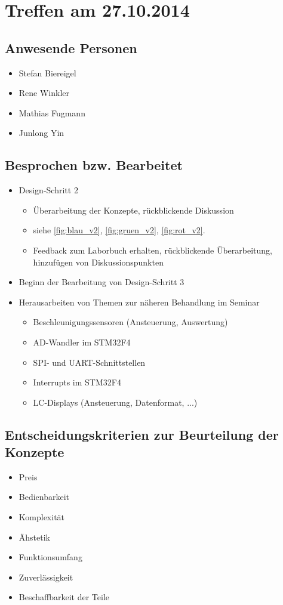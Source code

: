 \chapter{Treffen am 27.10.2014}
\section{Anwesende Personen}
\begin{itemize}
	\item Stefan Biereigel
	\item Rene Winkler
	\item Mathias Fugmann
	\item Junlong Yin
\end{itemize}

\section{Besprochen bzw. Bearbeitet}
\begin{itemize}
	\item Design-Schritt 2
	\begin{itemize}
		\item Überarbeitung der Konzepte, rückblickende Diskussion
		\item siehe \autoref{fig:blau_v2}, \autoref{fig:gruen_v2}, \autoref{fig:rot_v2}.
		\item Feedback zum Laborbuch erhalten, rückblickende Überarbeitung, hinzufügen von Diskussionspunkten
	\end{itemize}
	\item Beginn der Bearbeitung von Design-Schritt 3
	\item Herausarbeiten von Themen zur näheren Behandlung im Seminar
	\begin{itemize}
		\item Beschleunigungssensoren (Ansteuerung, Auswertung)
		\item AD-Wandler im STM32F4
		\item SPI- und UART-Schnittstellen
		\item Interrupts im STM32F4
		\item LC-Displays (Ansteuerung, Datenformat, ...)
	\end{itemize}
\end{itemize}

\section{Entscheidungskriterien zur Beurteilung der Konzepte}
\begin{itemize}
	\item Preis
	\item Bedienbarkeit
	\item Komplexität
	\item Ähstetik
	\item Funktionsumfang
	\item Zuverlässigkeit
	\item Beschaffbarkeit der Teile
\end{itemize}